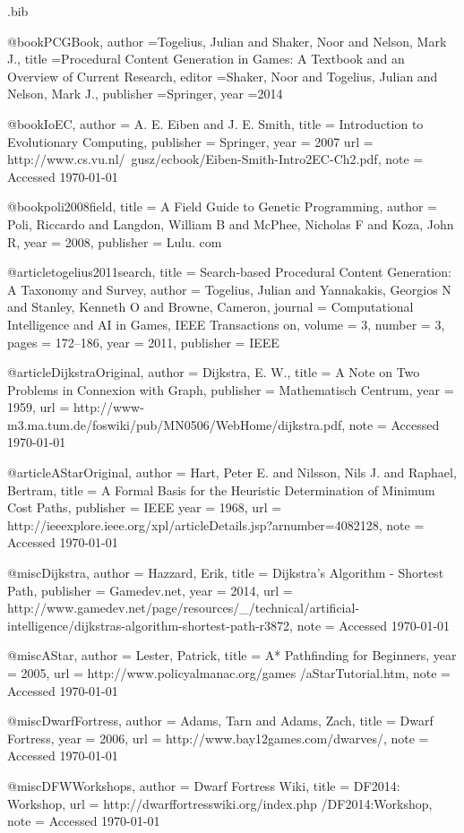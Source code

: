 \begin{filecontents*}{\jobname.bib}

@book{PCGBook,
	author	={Togelius, Julian and Shaker, Noor and Nelson, Mark J.},
	title		={{P}rocedural {C}ontent {G}eneration in {G}ames: {A} {T}extbook and an {O}verview of {C}urrent {R}esearch},
	editor		={Shaker, Noor and Togelius, Julian and Nelson, Mark J.},
	publisher	={Springer},
	year		={2014}
}

@book{IoEC,
	author 	= {A. E. Eiben and J. E. Smith},
	title 		= {{I}ntroduction to {E}volutionary {C}omputing},
	publisher 	= {Springer},
	year 		= {2007}
	url 		= {http://www.cs.vu.nl/~gusz/ecbook/Eiben-Smith-Intro2EC-Ch2.pdf},
	note		= {Accessed \today}
}

@book{poli2008field,
	title		= {{A} {F}ield {G}uide to {G}enetic {P}rogramming},
	author	= {Poli, Riccardo and Langdon, William B and McPhee, Nicholas F and Koza, John R},
	year		= {2008},
	publisher	= {Lulu. com}
}

@article{togelius2011search,
	title 		= {{S}earch-based {P}rocedural {C}ontent {G}eneration: {A} {T}axonomy and {S}urvey},
	author 	= {Togelius, Julian and Yannakakis, Georgios N and Stanley, Kenneth O and Browne, Cameron},
	journal 	= {Computational Intelligence and AI in Games, IEEE Transactions on},
	volume 	= {3},
	number	= {3},
	pages		= {172--186},
	year		= {2011},
	publisher	= {IEEE}
}

@article{DijkstraOriginal,
	author 	= {Dijkstra, E. W.},
	title 		= {{A} {N}ote on {T}wo {P}roblems in {C}onnexion with {G}raph},
	publisher 	= {Mathematisch Centrum},
	year 		= {1959}, 
	url 		= {http://www-m3.ma.tum.de/foswiki/pub/MN0506/WebHome/dijkstra.pdf},
	note		= {Accessed \today}
}

@article{AStarOriginal,
	author 	= {Hart, Peter E. and Nilsson, Nils J. and Raphael, Bertram},
	title 		= {{A} {F}ormal {B}asis for the {H}euristic {D}etermination of {M}inimum {C}ost {P}aths},
	publisher	= {IEEE}
	year 		= {1968}, 
	url 		= {http://ieeexplore.ieee.org/xpl/articleDetails.jsp?arnumber=4082128},
	note		= {Accessed \today}
}

@misc{Dijkstra,
	author 	= {Hazzard, Erik},
	title 		= {{D}ijkstra's {A}lgorithm - {S}hortest {P}ath},
	publisher 	= {Gamedev.net},
	year 		= {2014}, 
	url 		= {http://www.gamedev.net/page/resources/\_/technical/artificial-intelligence/dijkstras-algorithm-shortest-path-r3872},
	note		= {Accessed \today}
}

@misc{AStar,
	author 	= {Lester, Patrick},
	title 		= {A* Pathfinding for Beginners},
	year 		= {2005}, 
	url 		= {http://www.policyalmanac.org/games /aStarTutorial.htm},
	note		= {Accessed \today}
}

@misc{DwarfFortress,
	author 	= {Adams, Tarn and Adams, Zach},
	title 		= {{D}warf {F}ortress},
	year 		= {2006}, 
	url 		= {http://www.bay12games.com/dwarves/},
	note		= {Accessed \today}
}

@misc{DFWWorkshops,
	author 	= {Dwarf Fortress Wiki},
	title 		= {{D}{F}2014: {W}orkshop},
	url 		= {http://dwarffortresswiki.org/index.php /DF2014:Workshop},
	note		= {Accessed \today}
}

\end{filecontents*}

\nocite{*}
